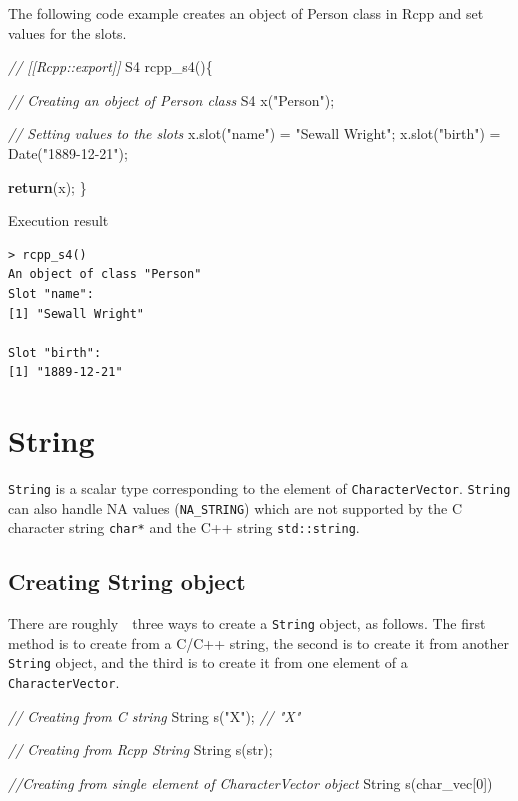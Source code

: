 \documentclass[]{book}
\newenvironment{Shaded}{\begin{snugshade}}{\end{snugshade}}
\newcommand{\DecValTok}[1]{\textcolor[rgb]{0.00,0.00,0.81}{#1}}
\newcommand{\StringTok}[1]{\textcolor[rgb]{0.31,0.60,0.02}{#1}}
\newcommand{\CommentTok}[1]{\textcolor[rgb]{0.56,0.35,0.01}{\textit{#1}}}
\newcommand{\ControlFlowTok}[1]{\textcolor[rgb]{0.13,0.29,0.53}{\textbf{#1}}}
\newcommand{\NormalTok}[1]{#1}
\theoremstyle{definition}
\theoremstyle{definition}
\theoremstyle{remark}
\begin{document}
The following code example creates an object of Person class in Rcpp and
set values for the slots.

\begin{Shaded}
\begin{Highlighting}[]
\CommentTok{// [[Rcpp::export]]}
\NormalTok{S4 rcpp_s4()\{}

    \CommentTok{// Creating an object of Person class}
\NormalTok{    S4 x(}\StringTok{"Person"}\NormalTok{);}

    \CommentTok{// Setting values to the slots}
\NormalTok{    x.slot(}\StringTok{"name"}\NormalTok{)  = }\StringTok{"Sewall Wright"}\NormalTok{;}
\NormalTok{    x.slot(}\StringTok{"birth"}\NormalTok{) = Date(}\StringTok{"1889-12-21"}\NormalTok{);}

    \ControlFlowTok{return}\NormalTok{(x);}
\NormalTok{\}}
\end{Highlighting}
\end{Shaded}

Execution result

\begin{verbatim}
> rcpp_s4()
An object of class "Person"
Slot "name":
[1] "Sewall Wright"

Slot "birth":
[1] "1889-12-21"
\end{verbatim}

\chapter{String}\label{string}

\texttt{String} is a scalar type corresponding to the element of
\texttt{CharacterVector}. \texttt{String} can also handle NA values
(\texttt{NA\_STRING}) which are not supported by the C character string
\texttt{char*} and the C++ string \texttt{std::string}.

\section{Creating String object}\label{creating-string-object}

There are roughly　three ways to create a \texttt{String} object, as
follows. The first method is to create from a C/C++ string, the second
is to create it from another \texttt{String} object, and the third is to
create it from one element of a \texttt{CharacterVector}.

\begin{Shaded}
\begin{Highlighting}[]
\CommentTok{// Creating from C string}
\NormalTok{String s(}\StringTok{"X"}\NormalTok{); }\CommentTok{// "X"}

\CommentTok{// Creating from Rcpp String}
\NormalTok{String s(str);}

\CommentTok{//Creating from single element of CharacterVector object}
\NormalTok{String s(char_vec[}\DecValTok{0}\NormalTok{])}
\end{Highlighting}
\end{Shaded}
\end{document}
